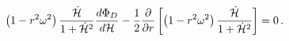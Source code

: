 \begin{equation}
\label{eq-r4}
\left(1-r^2 \omega^2\right) \frac{ \dot{{\cal H}}}{1+\dot{{\cal H}}^2}
\frac{d \Phi_D}{d{\cal H}}
-\frac{1}{2} \frac{\partial}{\partial r}\left[\left(1-r^2 \omega^2\right)
\frac{ \dot{{\cal H}}}{1+\dot{{\cal H}}^2} \right] =0\,.
\end{equation}

